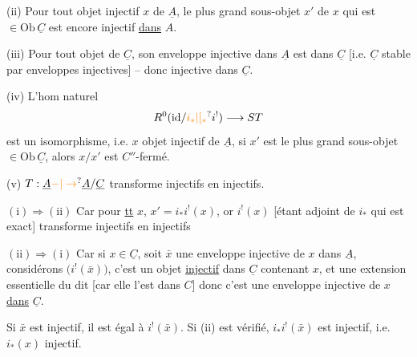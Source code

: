 (ii) Pour tout objet injectif $x$ de $\underline A$, le plus grand sous-objet $x'$ de $x$ qui est $\in\mathrm{Ob}\,\underline C$ est encore injectif \uline{dans} $A$.

(iii) Pour tout objet de $\underline C$, son enveloppe injective dans $\underline A$ est dans $\underline C$ [i.e. $\underline C$ stable par enveloppes injectives] -- donc  injective dans $\underline C$.

\diagram{\begin{tikzcd}[ampersand replacement=\&,row sep=1.2em,column sep=1em]
{} \arrow[d] \arrow[dd,bend right=22,Rightarrow] \& \\ {} \& \\ {} \&
\end{tikzcd}}

(iv)  L'hom naturel
\[
R^0(\mathrm{id}/\unsure{i_*|[{}_*}i^!)\longrightarrow ST
\]
est un isomorphisme, i.e.  $x$ objet injectif de $\underline A$,  si $x'$  est le plus grand sous-objet $\in\mathrm{Ob}\,\underline C$, alors $x/x'$ est $C''$-fermé.


(v) $T:\underline A\unsure{\mathord{-}|\to}\underline A/\underline C$ transforme injectifs en injectifs.

$(\mathrm{i})\Rightarrow(\mathrm{ii})$ Car  pour \uline{tt} $x$, $x'=i_*i^!(x)$, or $i^!(x)$ [étant adjoint de $i_*$ qui est exact] transforme injectifs en injectifs

$(\mathrm{ii})\Rightarrow(\mathrm{i})$ Car si $x\in\underline C$, soit $\bar x$ une enveloppe injective de $x$ dans $\underline A$,  considérons $\bigl(i^!(\bar x)\bigr)$, c'est un objet \uline{injectif} dans $\underline C$ contenant $x$, et une extension essentielle du dit [car elle l'est dans $C$] donc c'est une enveloppe injective de $x$ \uline{dans} $\underline C$.

Si $\bar x$ est injectif, il est  égal à $i^!(\bar x)$. Si (ii) est vérifié, $i_*i^!(\bar x)$ est injectif, i.e. $i_*(x)$ injectif.

